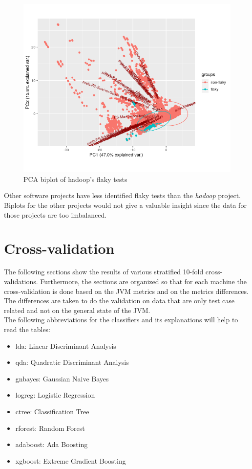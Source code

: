 \documentclass{seal_thesis}
\begin{document}
\begin{figure}[ht]
  \centering
  \includegraphics[scale=0.6]{images/hadoop-vm9-own}
  \caption{PCA biplot of hadoop's flaky tests}
  \label{fig:biplot}
\end{figure}

\noindent Other software projects have less identified flaky tests than the \textit{hadoop} project. Biplots for the other projects would not give a valuable insight since the data for those projects are too imbalanced.

\section{Cross-validation}
The following sections show the results of various stratified 10-fold cross-validations. Furthermore, the sections are organized so that for each machine the cross-validation is done based on the JVM metrics and on the metrics differences. The differences are taken to do the validation on data that are only test case related and not on the general state of the JVM. \\

\noindent The following abbreviations for the classifiers and its explanations will help to read the tables:
\begin{itemize}
\item lda: Linear Discriminant Analysis
\item qda: Quadratic Discriminant Analysis
\item gnbayes: Gaussian Naive Bayes
\item logreg: Logistic Regression
\item ctree: Classification Tree
\item rforest: Random Forest
\item adaboost: Ada Boosting
\item xgboost: Extreme Gradient Boosting
\end{itemize}
\end{document}
